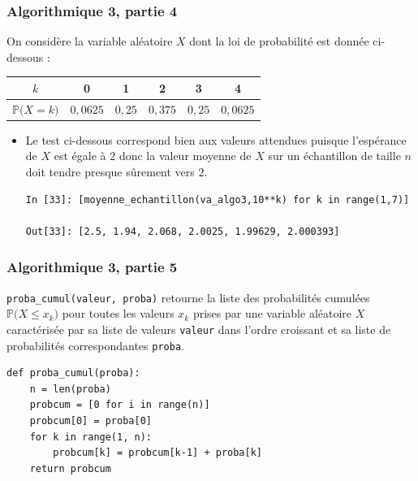 \documentclass[11pt, hyperref={urlcolor=red,%
            linkcolor=blue, %
            colorlinks=true}]{beamer}
\newcommand{\proba}[1]{\mathbb{P}\big(#1\big)}
\begin{document}
\begin{frame}[fragile]
\frametitle{Algorithmique 3,  partie 4}

On considère la variable aléatoire $X$ dont la loi de probabilité est donnée ci-dessous :
	
	\begin{center}
\begin{tabular}{|c|c|c|c|c|c|}
\hline 
$k$ & 0 & 1 & 2 & 3 & 4 \\ 
\hline 
$\proba{X=k}$ & $0,0625$ & $0,25$ & $0,375$ & $0,25$ & $0,0625$ \\ 
\hline 
\end{tabular} 
	\end{center}
	
\begin{itemize} 

 \item Le test ci-dessous correspond bien aux valeurs attendues puisque l'espérance de $X$ est égale à $2$ donc la valeur moyenne de $X$  sur un échantillon de taille $n$ doit tendre presque sûrement vers $2$.

\begin{lstlisting}
In [33]: [moyenne_echantillon(va_algo3,10**k) for k in range(1,7)]                                                                                                                                          

Out[33]: [2.5, 1.94, 2.068, 2.0025, 1.99629, 2.000393]
\end{lstlisting}

\end{itemize}


\end{frame}




\begin{frame}[fragile]
\frametitle{Algorithmique 3,  partie 5}

\texttt{proba\_cumul(valeur, proba)} retourne la liste des probabilités cumulées $\proba{X \leqslant x_{k}}$ pour toutes les valeurs $x_{k}$ prises par une variable aléatoire $X$ caractérisée par sa liste de valeurs \texttt{valeur} dans l'ordre croissant et sa liste de probabilités correspondantes \texttt{proba}.


\begin{lstlisting}[style=rond]
def proba_cumul(proba):
    n = len(proba)
    probcum = [0 for i in range(n)]
    probcum[0] = proba[0] 
    for k in range(1, n):
        probcum[k] = probcum[k-1] + proba[k]
    return probcum
\end{lstlisting}



\end{frame}
\end{document}
